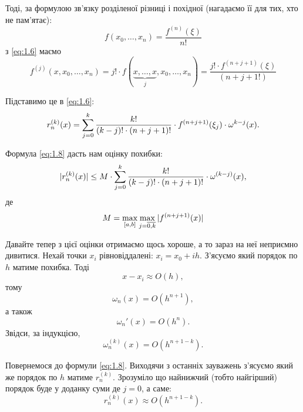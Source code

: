 Тоді, за формулою зв'язку розділеної різниці і похідної (нагадаємо її для тих, хто не пам'ятає):
\begin{equation*}
	f(x_0, \ldots , x_n) = \frac{f^{(n)}(\xi)}{n!}
\end{equation*}
з \eqref{eq:1.6} маємо
\begin{equation}
	\label{eq:1.7}
	f^{(j)}(x, x_0, \ldots, x_n) = j! \cdot f\left( \underset{j}{\underbrace{x, \ldots, x}}, x_0, \ldots, x_n \right) = \frac{j! \cdot f^{(n + j + 1)}(\xi)}{(n + j + 1!)}
\end{equation}

Підставимо це в \eqref{eq:1.6}:
\begin{equation}
	\label{eq:1.8}
	r_n^{(k)}(x) = \displaystyle\sum\limits_{j = 0}^k \frac{k!}{(k-j)! \cdot (n+j+1)!} \cdot f^{(n + j + 1)}(\xi_j) \cdot \omega^{k - j}(x).
\end{equation}

Формула \eqref{eq:1.8} дасть нам оцінку похибки:
\begin{equation}
	\label{eq:1.9}
	|r_n^{(k)}(x)| \le M \cdot \displaystyle\sum\limits_{j = 0}^k \frac{k!}{(k-j)! \cdot (n+j+1)!} \cdot \omega^{(k - j)}(x),
\end{equation}
де
\begin{equation*}
	M = \displaystyle\max\limits_{[a,b]} \displaystyle\max\limits_{j = \overline{0, k}} |f^{(n + j + 1)}(x)|
\end{equation*}

Давайте тепер з цієї оцінки отримаємо щось хороше, а то зараз на неї неприємно дивитися. Нехай точки $x_i$ рівновіддалені: $x_i = x_0 + i h$. З'ясуємо який порядок по $h$ матиме похибка. Тоді
\begin{equation*}
	x - x_i \approx O(h),
\end{equation*}
тому
\begin{equation*}
	\omega_n(x) = O(h^{n + 1}),
\end{equation*}
а також 
\begin{equation*}
	\omega_n'(x) = O(h^n).
\end{equation*}
Звідси, за індукцією,
\begin{equation*}
	\omega_n^{(k)}(x) = O(h^{n + 1 - k}).
\end{equation*}

Повернемося до формули \eqref{eq:1.8}. Виходячи з останніх зауважень з'ясуємо який же порядок по $h$ матиме $r_n^{(k)}$. Зрозуміло що найнижчий (тобто найгірший) порядок буде у доданку суми де $j = 0$, а саме:
\begin{equation}
	\label{eq:1.10}
	r_n^{(k)}(x) \approx O(h^{n + 1 - k}).
\end{equation}

